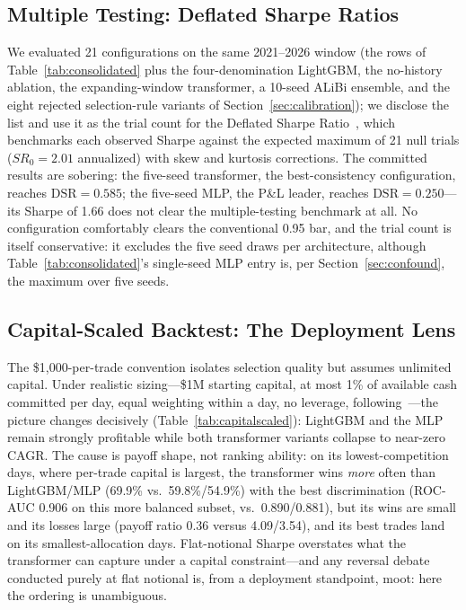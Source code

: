 \documentclass[sigconf,review,anonymous]{acmart}
\begin{document}
\subsection{Multiple Testing: Deflated Sharpe Ratios}
\label{sec:dsr}
We evaluated 21 configurations on the same 2021--2026 window (the rows of Table~\ref{tab:consolidated} plus the four-denomination LightGBM, the no-history ablation, the expanding-window transformer, a 10-seed ALiBi ensemble, and the eight rejected selection-rule variants of Section~\ref{sec:calibration}); we disclose the list and use it as the trial count for the Deflated Sharpe Ratio~\cite{bailey2014deflated}, which benchmarks each observed Sharpe against the expected maximum of 21 null trials ($SR_0=2.01$ annualized) with skew and kurtosis corrections. The committed results are sobering: the five-seed transformer, the best-consistency configuration, reaches $\mathrm{DSR}=0.585$; the five-seed MLP, the P\&L leader, reaches $\mathrm{DSR}=0.250$---its Sharpe of 1.66 does not clear the multiple-testing benchmark at all. No configuration comfortably clears the conventional 0.95 bar, and the trial count is itself conservative: it excludes the five seed draws per architecture, although Table~\ref{tab:consolidated}'s single-seed MLP entry is, per Section~\ref{sec:confound}, the maximum over five seeds.

\subsection{Capital-Scaled Backtest: The Deployment Lens}
\label{sec:capitalscaled}
The \$1{,}000-per-trade convention isolates selection quality but assumes unlimited capital. Under realistic sizing---\$1M starting capital, at most 1\% of available cash committed per day, equal weighting within a day, no leverage, following~\cite{glasserman2025tp2}---the picture changes decisively (Table~\ref{tab:capitalscaled}): LightGBM and the MLP remain strongly profitable while both transformer variants collapse to near-zero CAGR. The cause is payoff shape, not ranking ability: on its lowest-competition days, where per-trade capital is largest, the transformer wins \emph{more} often than LightGBM/MLP (69.9\% vs.\ 59.8\%/54.9\%) with the best discrimination (ROC-AUC 0.906 on this more balanced subset, vs.\ 0.890/0.881), but its wins are small and its losses large (payoff ratio 0.36 versus 4.09/3.54), and its best trades land on its smallest-allocation days. Flat-notional Sharpe overstates what the transformer can capture under a capital constraint---and any reversal debate conducted purely at flat notional is, from a deployment standpoint, moot: here the ordering is unambiguous.
\end{document}
